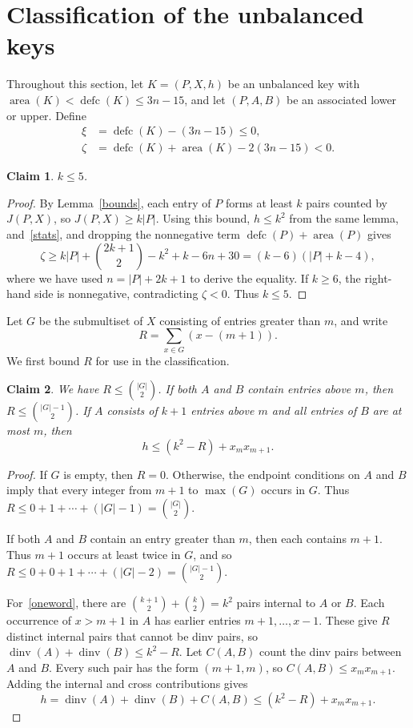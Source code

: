 \documentclass[11pt]{article}
\DeclareMathOperator{\area}{area}\DeclareMathOperator{\dinv}{dinv}
\DeclareMathOperator{\defc}{defc}\DeclareMathOperator{\sym}{sym}
\newtheorem{claim}{Claim}
\begin{document}
\section{Classification of the unbalanced keys}
Throughout this section, let $K=(P,X,h)$ be an unbalanced key with $\area(K)<\defc(K)\le3n-15$, and let $(P,A,B)$ be an associated lower or upper. Define
\[
 \begin{aligned}
 \xi&=\defc(K)-(3n-15)\le0,\\
 \zeta&=\defc(K)+\area(K)-2(3n-15)<0.
 \end{aligned}
\]
\begin{claim}\label{k-bound}
$k\le5$.
\end{claim}
\begin{proof}
By Lemma~\ref{bounds}, each entry of $P$ forms at least $k$ pairs counted by $J(P,X)$, so $J(P,X)\ge k|P|$. Using this bound, $h\le k^2$ from the same lemma, and~\eqref{stats}, and dropping the nonnegative term $\defc(P)+\area(P)$ gives
\[
 \zeta\ge k|P|+\binom{2k+1}{2}-k^2+k-6n+30=(k-6)(|P|+k-4),
\]
where we have used $n=|P|+2k+1$ to derive the equality. If $k\ge6$, the right-hand side is nonnegative, contradicting $\zeta<0$. Thus $k\le5$.
\end{proof}

Let $G$ be the submultiset of $X$ consisting of entries greater than $m$, and write
\[
 R=\sum_{x\in G}(x-(m+1)).
\]
We first bound $R$ for use in the classification.

\begin{claim}\label{excess-bounds}
We have $R\le\binom{|G|}{2}$. If both $A$ and $B$ contain entries above $m$, then $R\le\binom{|G|-1}2$. If $A$ consists of $k+1$ entries above $m$ and all entries of $B$ are at most $m$, then
\begin{equation}\label{oneword}
 h\le(k^2-R)+x_mx_{m+1}.
\end{equation}
\end{claim}
\begin{proof}
If $G$ is empty, then $R=0$. Otherwise, the endpoint conditions on $A$ and $B$ imply that every integer from $m+1$ to $\max(G)$ occurs in $G$. Thus $R \le0+1+\cdots+(|G|-1)=\binom{|G|}{2}$.

If both $A$ and $B$ contain an entry greater than $m$, then each contains $m+1$. Thus $m+1$ occurs at least twice in $G$, and so
 $R\le0+0+1+\cdots+(|G|-2)=\binom{|G|-1}2$.

For~\eqref{oneword}, there are $\binom{k+1}2+\binom k2=k^2$ pairs internal to $A$ or $B$. Each occurrence of $x>m+1$ in $A$ has earlier entries $m+1,\ldots,x-1$. These give $R$ distinct internal pairs that cannot be dinv pairs, so $\dinv(A)+\dinv(B)\le k^2-R$. Let $C(A,B)$ count the dinv pairs between $A$ and $B$. Every such pair has the form $(m+1,m)$, so $C(A,B)\le x_mx_{m+1}$. Adding the internal and cross contributions gives
\[
 h=\dinv(A)+\dinv(B)+C(A,B)\le(k^2-R)+x_mx_{m+1}.
\]
\end{proof}
\end{document}
